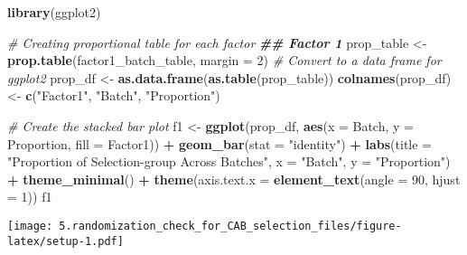 \documentclass[
]{article}
\newenvironment{Shaded}{\begin{snugshade}}{\end{snugshade}}
\newcommand{\AttributeTok}[1]{\textcolor[rgb]{0.13,0.29,0.53}{#1}}
\newcommand{\CommentTok}[1]{\textcolor[rgb]{0.56,0.35,0.01}{\textit{#1}}}
\newcommand{\DecValTok}[1]{\textcolor[rgb]{0.00,0.00,0.81}{#1}}
\newcommand{\DocumentationTok}[1]{\textcolor[rgb]{0.56,0.35,0.01}{\textbf{\textit{#1}}}}
\newcommand{\FunctionTok}[1]{\textcolor[rgb]{0.13,0.29,0.53}{\textbf{#1}}}
\newcommand{\NormalTok}[1]{#1}
\newcommand{\OtherTok}[1]{\textcolor[rgb]{0.56,0.35,0.01}{#1}}
\newcommand{\SpecialCharTok}[1]{\textcolor[rgb]{0.81,0.36,0.00}{\textbf{#1}}}
\newcommand{\StringTok}[1]{\textcolor[rgb]{0.31,0.60,0.02}{#1}}
\begin{document}
\begin{Shaded}
\begin{Highlighting}[]
\FunctionTok{library}\NormalTok{(ggplot2)}

\CommentTok{\# Creating proportional table for each factor}
\DocumentationTok{\#\# Factor 1}
\NormalTok{prop\_table }\OtherTok{\textless{}{-}} \FunctionTok{prop.table}\NormalTok{(factor1\_batch\_table, }\AttributeTok{margin =} \DecValTok{2}\NormalTok{)}
\CommentTok{\# Convert to a data frame for ggplot2}
\NormalTok{prop\_df }\OtherTok{\textless{}{-}} \FunctionTok{as.data.frame}\NormalTok{(}\FunctionTok{as.table}\NormalTok{(prop\_table))}
\FunctionTok{colnames}\NormalTok{(prop\_df) }\OtherTok{\textless{}{-}} \FunctionTok{c}\NormalTok{(}\StringTok{"Factor1"}\NormalTok{, }\StringTok{"Batch"}\NormalTok{, }\StringTok{"Proportion"}\NormalTok{)}

\CommentTok{\# Create the stacked bar plot}
\NormalTok{f1 }\OtherTok{\textless{}{-}} \FunctionTok{ggplot}\NormalTok{(prop\_df, }\FunctionTok{aes}\NormalTok{(}\AttributeTok{x =}\NormalTok{ Batch, }\AttributeTok{y =}\NormalTok{ Proportion, }\AttributeTok{fill =}\NormalTok{ Factor1)) }\SpecialCharTok{+}
  \FunctionTok{geom\_bar}\NormalTok{(}\AttributeTok{stat =} \StringTok{"identity"}\NormalTok{) }\SpecialCharTok{+}
  \FunctionTok{labs}\NormalTok{(}\AttributeTok{title =} \StringTok{"Proportion of Selection{-}group Across Batches"}\NormalTok{, }\AttributeTok{x =} \StringTok{"Batch"}\NormalTok{, }\AttributeTok{y =} \StringTok{"Proportion"}\NormalTok{) }\SpecialCharTok{+}
  \FunctionTok{theme\_minimal}\NormalTok{() }\SpecialCharTok{+}
  \FunctionTok{theme}\NormalTok{(}\AttributeTok{axis.text.x =} \FunctionTok{element\_text}\NormalTok{(}\AttributeTok{angle =} \DecValTok{90}\NormalTok{, }\AttributeTok{hjust =} \DecValTok{1}\NormalTok{))}
\NormalTok{f1}
\end{Highlighting}
\end{Shaded}

\texttt{[image: 5.randomization\_check\_for\_CAB\_selection\_files/figure-latex/setup-1.pdf]}

\begin{Shaded}
\end{Shaded}
\end{document}
